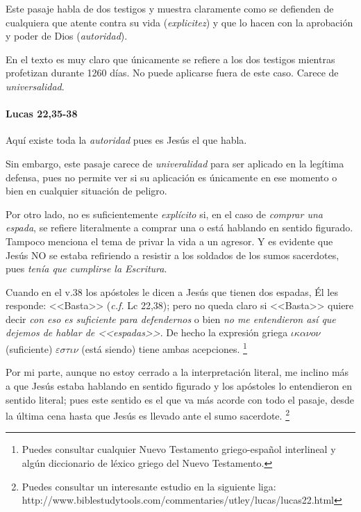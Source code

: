 \documentclass{article}
\begin{document}
Este pasaje habla de dos testigos y muestra claramente como se defienden de cualquiera que atente contra su vida (\emph{explicitez}) y que lo hacen con la aprobaci\'on y poder de Dios (\emph{autoridad}).

En el texto es muy claro que \'unicamente se refiere a los dos testigos mientras profetizan durante 1260 d\'{i}as. No puede aplicarse fuera de este caso. Carece de \emph{universalidad}.

\paragraph{Lucas 22,35-38}

Aqu\'{i} existe toda la \emph{autoridad} pues es Jes\'us el que habla.

Sin embargo, este pasaje carece de \emph{univeralidad} para ser aplicado en la leg\'{i}tima defensa, pues no permite ver si su aplicaci\'on es \'unicamente en ese momento o bien en cualquier situaci\'on de peligro.

Por otro lado, no es suficientemente \emph{expl\'{i}cito} si, en el caso de \emph{comprar una espada}, se refiere literalmente a comprar una o est\'a hablando en sentido figurado. Tampoco menciona el tema de privar la vida a un agresor. Y es evidente que Jes\'us NO se estaba refiriendo a resistir a los soldados de los sumos sacerdotes, pues \emph{ten\'{i}a que cumplirse la Escritura}.

Cuando en el v.38 los ap\'ostoles le dicen a Jes\'us que tienen dos espadas, \'El les responde: <<Basta>> (\emph{c.f.} Lc 22,38); pero no queda claro si <<Basta>> quiere decir \emph{con eso es suficiente para defendernos} o bien \emph{no me entendieron as\'{i} que dejemos de hablar de <<espadas>>}. De hecho la expresi\'on griega $\iota\kappa\alpha\nu o \nu$ (suficiente) $\varepsilon\sigma\tau\iota\nu$ (est\'a siendo) tiene ambas acepciones.%
    \footnote{Puedes consultar cualquier Nuevo Testamento griego-espa\~nol interlineal y alg\'un diccionario de l\'exico griego del Nuevo Testamento.}
    
Por mi parte, aunque no estoy cerrado a la interpretaci\'on literal, me inclino m\'as a que Jes\'us estaba hablando en sentido figurado y los ap\'ostoles lo entendieron en sentido literal; pues este sentido es el que va m\'as acorde con todo el pasaje, desde la \'ultima cena hasta que Jes\'us es llevado ante el sumo sacerdote.%
    \footnote{Puedes consultar un interesante estudio en la siguiente liga: http://www.biblestudytools.com/commentaries/utley/lucas/lucas22.html}
\end{document}
